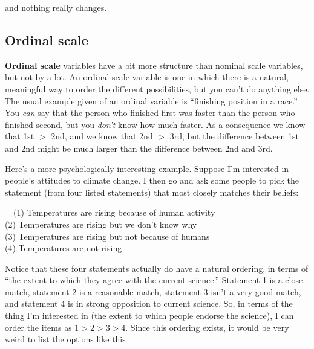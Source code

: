 \documentclass[
]{book}
\begin{document}
and nothing really changes.

\hypertarget{ordinal-scale}{%
\subsection{Ordinal scale}\label{ordinal-scale}}

{\textbf{Ordinal scale}} variables have a bit more structure than nominal scale variables, but not by a lot. An ordinal scale variable is one in which there is a natural, meaningful way to order the different possibilities, but you can't do anything else. The usual example given of an ordinal variable is ``finishing position in a race.'' You \emph{can} say that the person who finished first was faster than the person who finished second, but you \emph{don't} know how much faster. As a consequence we know that 1st \(>\) 2nd, and we know that 2nd \(>\) 3rd, but the difference between 1st and 2nd might be much larger than the difference between 2nd and 3rd.

Here's a more psychologically interesting example. Suppose I'm interested in people's attitudes to climate change. I then go and ask some people to pick the statement (from four listed statements) that most closely matches their beliefs:

~~(1) Temperatures are rising because of human activity\\
\hspace*{0.333em}\hspace*{0.333em}(2) Temperatures are rising but we don't know why\\
\hspace*{0.333em}\hspace*{0.333em}(3) Temperatures are rising but not because of humans\\
\hspace*{0.333em}\hspace*{0.333em}(4) Temperatures are not rising

\hfill\break
Notice that these four statements actually do have a natural ordering, in terms of ``the extent to which they agree with the current science.'' Statement 1 is a close match, statement 2 is a reasonable match, statement 3 isn't a very good match, and statement 4 is in strong opposition to current science. So, in terms of the thing I'm interested in (the extent to which people endorse the science), I can order the items as \(1 > 2 > 3 > 4\). Since this ordering exists, it would be very weird to list the options like this
\end{document}

